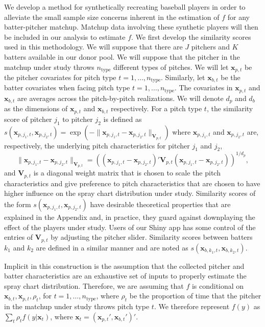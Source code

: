 \documentclass[12pt]{article}
\newcommand{\V}{\textbf{V}}
\newcommand{\x}{\textbf{x}}
\begin{document}
We develop a method for synthetically recreating baseball players in order to alleviate the small sample size concerns inherent in the estimation of $f$ for any batter-pitcher matchup. Matchup data involving these synthetic players will then be included in our analysis to estimate $f$. We first develop the similarity scores used in this methodology. We will suppose that there are $J$ pitchers and $K$ batters available in our donor pool. We will suppose that the pitcher in the matchup under study throws $n_{\text{type}}$ different types of pitches. We will let $\x_{p,t}$ be the pitcher covariates for pitch type $t = 1,\ldots,n_{\text{type}}$. Similarly, let $\x_{b,t}$ be the batter covariates when facing pitch type $t = 1,\ldots,n_{\text{type}}$. The covariates in $\x_{p,t}$ and $\x_{b,t}$ are averages across the pitch-by-pitch realizations. We will denote $d_p$ and $d_b$ as the dimensions of $\x_{p,t}$ and $\x_{b,t}$ respectively. For a pitch type $t$, the similarity score of pitcher $j_1$ to pitcher $j_2$ is defined as $s(\x_{p,j_1,t}, \x_{p,j_2,t}) = \exp(-\|\x_{p,j_1,t}-\x_{p,j_2,t}\|_{\V_{p,t}})$ where $\x_{p,j_1,t}$ and $\x_{p,j_2,t}$ are, respectively, the underlying pitch characteristics for pitcher $j_1$ and $j_2$,
\begin{equation} \label{Vpt}
   \|\x_{p,j_1,t}-\x_{p,j_2,t}\|_{\V_{p,t}}
     = \left((\x_{p,j_1,t}-\x_{p,j_2,t})'\V_{p,t}(\x_{p,j_1,t}-\x_{p,j_2,t})\right)^{1/d_p},
\end{equation}
and $\V_{p,t}$ is a diagonal weight matrix that is chosen to scale the pitch characteristics and give preference to pitch characteristics that are chosen to have higher influence on the spray chart distribution under study. Similarity scores of the form $s(\x_{p,j_1,t}, \x_{p,j_2,t})$ have desirable theoretical properties that are explained in the Appendix and, in practice, they guard against downplaying the effect of the players under study. Users of our Shiny app has some control of the entries of $\V_{p,t}$ by adjusting the pitcher slider. Similarity scores between batters $k_1$ and $k_2$ are defined in a similar manner and are noted as $s(\x_{b,k_1,t}, \x_{b,k_2,t})$.

Implicit in this construction is the assumption that the collected pitcher and batter characteristics are an exhaustive set of inputs to properly estimate the spray chart distribution. Therefore, we are assuming that $f$ is conditional on $\x_{b,t}, \x_{p,t}, \rho_t$, for $t = 1,\ldots,n_{\text{type}}$, where $\rho_t$ be the proportion of time that the pitcher in the matchup under study throws pitch type $t$. We therefore represent $f(y)$ as $\sum_t \rho_t f(y|\x_t)$, where $\x_t = (\x_{p,t}', \x_{b,t}')'$.
\end{document}
